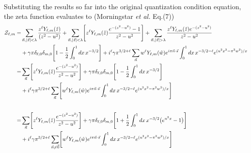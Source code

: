 \documentclass[a4paper]{article}
\begin{document}
Substituting the results so far into the original quantization condition equation,
 the zeta function evaluates to (Morningstar {\it et al.} Eq.(7))
\begin{align}
 {\cal Z}_{\ell,m}
 =&
 \sum_{\vec{n},|\vec{z}|<\lambda} \frac{ z^{\ell} Y_{\ell,m}(\hat{z}) }{ (z^{2} - u^{2}) }
 +\sum_{\vec{n},|\vec{z}|<\lambda}
 \Biggr[ z^{\ell} Y_{\ell,m}(\hat{z}) \frac{ e^{ -(z^{2} - u^{2})} - 1 }{ z^{2}-u^{2} } \Biggr]
 + \sum_{\vec{n},|\vec{z}|>\lambda}
 \frac{ z^{\ell} Y_{\ell,m}(\hat{z}) e^{- (z^{2} - u^{2})} }{ z^{2}-u^{2} }
 \nonumber\\
 &+ \gamma \pi \delta_{\ell,0} \delta_{m,0}
 \Biggr[ 1 - \frac{1}{2} \int_{0}^{1} dx \, x^{-3/2} \Biggr]
 + i^\ell \gamma \pi^{3/2+\ell}
 \sum_{\vec{n}} w^{\ell} Y_{\ell,m}(\hat{w}) e^{i\pi \vec{n}\cdot\vec{s}}
 \int_{0}^{1} dx \, x^{-3/2-\ell} e^{ (u^{2} x^{2} -\pi^{2}w^{2}) /x }
 \nonumber\\
 =& \sum_{\vec{n}}
 \Biggr[ z^{\ell} Y_{\ell,m}(\hat{z}) \frac{ e^{ -(z^{2} - u^{2})} }{ z^{2}-u^{2} } \Biggr]
 + \gamma \pi \delta_{\ell,0} \delta_{m,0}
 \Biggr[ 1 - \frac{1}{2} \int_{0}^{1} dx \, x^{-3/2} \Biggr]
 \nonumber\\
 &+ i^\ell \gamma \pi^{3/2+\ell}
 \sum_{\vec{n}} \Biggr[ w^{\ell} Y_{\ell,m}(\hat{w}) e^{i\pi \vec{n}\cdot\vec{s}}
 \int_{0}^{1} dx \, x^{-3/2-\ell} e^{ (u^{2} x^{2} -\pi^{2}w^{2}) /x } \Biggr]
 \nonumber\\[2em]
 =& \sum_{\vec{n}}
 \Biggr[ z^{\ell} Y_{\ell,m}(\hat{z}) \frac{ e^{ -(z^{2} - u^{2})} }{ z^{2}-u^{2} } \Biggr]
 + \gamma \pi \delta_{\ell,0} \delta_{m,0} \Biggr[ 
 1 + \frac{1}{2} \int_{0}^{1} dx \, x^{-3/2} \big( e^{ u^{2} x } - 1 \big) \Biggr]
 \nonumber\\
 &+ i^\ell \gamma \pi^{3/2+\ell}
 \sum_{\vec{n}\neq\vec{0}} \Biggr[ w^{\ell} Y_{\ell,m}(\hat{w}) e^{i\pi \vec{n}\cdot\vec{s}}
 \int_{0}^{1} dx \, x^{-3/2-\ell} e^{ (u^{2} x^{2} -\pi^{2}w^{2}) /x } \Biggr]
\end{align}
\end{document}
